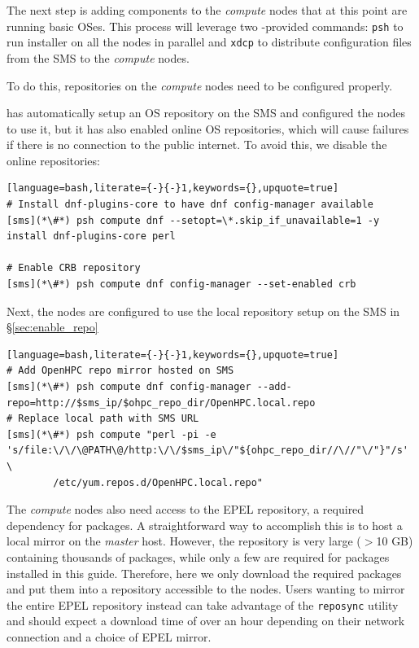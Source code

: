 
The next step is adding \OHPC{} components to the {\em compute} nodes that at this
point are running basic OSes.  This process will leverage two \xCAT{}-provided
commands: \texttt{psh} to run \texttt{\pkgmgr{}} installer on all the
nodes in parallel  and \texttt{xdcp} to distribute configuration files from the
SMS to the {\em compute} nodes.

\noindent To do this, repositories on the {\em compute} nodes need to be configured
properly.

\xCAT{} has automatically setup an  OS repository on the SMS and configured the
nodes to use it, but it has  also enabled online OS repositories, which will
cause  \texttt{\pkgmgr{}} failures if there is no connection to the public internet.
To avoid this, we disable the online repositories:

\begin{lstlisting}[language=bash,literate={-}{-}1,keywords={},upquote=true]
# Install dnf-plugins-core to have dnf config-manager available
[sms](*\#*) psh compute dnf --setopt=\*.skip_if_unavailable=1 -y install dnf-plugins-core perl

# Enable CRB repository
[sms](*\#*) psh compute dnf config-manager --set-enabled crb
\end{lstlisting}

\noindent Next, the nodes are configured to use the local \OHPC{} repository
setup on the SMS in \S\ref{sec:enable_repo}

\begin{lstlisting}[language=bash,literate={-}{-}1,keywords={},upquote=true]
# Add OpenHPC repo mirror hosted on SMS
[sms](*\#*) psh compute dnf config-manager --add-repo=http://$sms_ip/$ohpc_repo_dir/OpenHPC.local.repo
# Replace local path with SMS URL
[sms](*\#*) psh compute "perl -pi -e 's/file:\/\/\@PATH\@/http:\/\/$sms_ip\/"${ohpc_repo_dir//\//"\/"}"/s' \
        /etc/yum.repos.d/OpenHPC.local.repo"
\end{lstlisting}

The {\em compute} nodes also need access to the EPEL repository, a required
dependency for \OHPC{} packages. A straightforward way to accomplish this is to
host a local mirror on the {\em master} host. However, the repository is very
large ($>$10 GB) containing thousands of packages, while only a few
are required for packages installed in this guide. Therefore,
here we only download the required packages and put them into a repository
accessible to the nodes.  Users wanting to mirror the entire EPEL repository
instead can take advantage of the \texttt{reposync} utility and should expect a
download time of over an hour depending on their network connection and a choice
of EPEL mirror.

